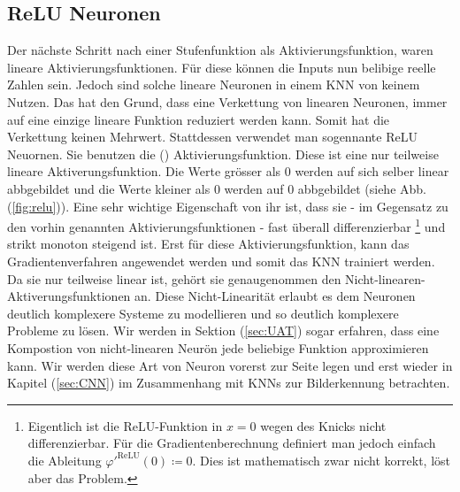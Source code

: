 \cite{wiki:kuenstliches_neuron}
\cite{wiki:perzeptron}


\subsection{ReLU Neuronen}\label{sec:ReLU}
Der nächste Schritt nach einer Stufenfunktion als Aktivierungsfunktion, waren
lineare Aktivierungsfunktionen. Für diese können die Inputs nun belibige reelle
Zahlen sein.
Jedoch sind solche lineare Neuronen in einem KNN von keinem Nutzen.
Das hat den Grund, dass eine Verkettung von linearen Neuronen,
immer auf eine einzige lineare Funktion reduziert werden kann. Somit hat
die Verkettung keinen Mehrwert.
\para{}
Stattdessen verwendet man sogennante ReLU Neuornen. Sie benutzen die
 () Aktivierungsfunktion.
Diese ist
eine nur teilweise lineare Aktiverungsfunktion. Die Werte grösser als 0 werden
auf sich selber linear abbgebildet und die Werte kleiner als 0 werden auf 0
abbgebildet (siehe Abb. (\ref{fig:relu})).
Eine sehr wichtige Eigenschaft von ihr ist, dass sie - im Gegensatz zu den vorhin
genannten Aktivierungsfunktionen - fast überall differenzierbar%
\footnote{%
  Eigentlich ist die ReLU-Funktion in $x=0$ wegen des Knicks nicht
  differenzierbar. Für die Gradientenberechnung definiert man jedoch einfach
  die Ableitung $\varphi'^{\text{ReLU}}(0) \coloneqq 0$. Dies ist mathematisch zwar nicht
  korrekt, löst aber das Problem.
}%
und strikt monoton
steigend ist. Erst für diese Aktivierungsfunktion, kann das Gradientenverfahren
angewendet werden und somit das KNN trainiert werden.
\para{}
Da sie nur teilweise linear ist, gehört sie genaugenommen den
Nicht-linearen-Aktiverungsfunktionen an. Diese Nicht-Linearität erlaubt es dem
Neuronen deutlich komplexere Systeme zu modellieren und so deutlich komplexere
Probleme zu lösen. Wir werden in Sektion (\ref{sec:UAT}) sogar erfahren, dass
eine Kompostion von nicht-linearen Neurön jede beliebige Funktion approximieren kann.
\para{}
Wir werden diese Art von Neuron vorerst zur Seite legen und erst wieder in
Kapitel (\ref{sec:CNN}) im Zusammenhang mit KNNs zur Bilderkennung betrachten.
\para{}
